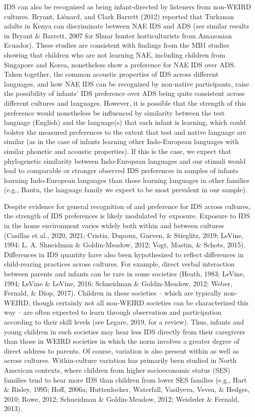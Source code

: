 \documentclass[
  ,man,floatsintext]{apa6}
\begin{document}
IDS can also be recognized as being infant-directed by listeners from non-WEIRD cultures. Bryant, Liénard, and Clark Barrett (2012) reported that Turkanan adults in Kenya can discriminate between NAE IDS and ADS (see similar results in Bryant \& Barrett, 2007 for Shuar hunter horticulturists from Amazonian Ecuador). These studies are consistent with findings from the MB1 studies showing that children who are not learning NAE, including children from Singapore and Korea, nonetheless show a preference for NAE IDS over ADS. Taken together, the common acoustic properties of IDS across different languages, and how NAE IDS can be recognized by non-native participants, raise the possibility of infants' IDS preference over ADS being quite consistent across different cultures and languages. However, it is possible that the strength of this preference would nonetheless be influenced by similarity between the test language (English) and the language(s) that each infant is learning, which could bolster the measured preferences to the extent that test and native language are similar (as in the case of infants learning other Indo-European languages with similar phonetic and acoustic properties). If this is the case, we expect that phylogenetic similarity between Indo-European languages and our stimuli would lead to comparable or stronger observed IDS preferences in samples of infants learning Indo-European languages than those learning languages in other families (e.g., Bantu, the language family we expect to be most prevalent in our sample).

Despite evidence for general recognition of and preference for IDS across cultures, the strength of IDS preferences is likely modulated by exposure. Exposure to IDS in the home environment varies widely both within and between cultures (Casillas et al., 2020, 2021; Cristia, Dupoux, Gurven, \& Stieglitz, 2019; LeVine, 1994; L. A. Shneidman \& Goldin-Meadow, 2012; Vogt, Mastin, \& Schots, 2015). Differences in IDS quantity have also been hypothesized to reflect differences in child-rearing practices across cultures. For example, direct verbal interaction between parents and infants can be rare in some societies (Heath, 1983; LeVine, 1994; LeVine \& LeVine, 2016; Schneidman \& Goldin-Meadow, 2012; Weber, Fernald, \& Diop, 2017). Children in these societies -- which are typically non-WEIRD, though certainly not all non-WEIRD societies can be characterized this way -- are often expected to learn through observation and participation according to their skill levels (see Legare, 2019, for a review). Thus, infants and young children in such societies may hear less IDS directly from their caregivers than those in WEIRD societies in which the norm involves a greater degree of direct address to parents. Of course, variation is also present within as well as across cultures. Within-culture variation has primarily been studied in North American contexts, where children from higher socioeconomic status (SES) families tend to hear more IDS than children from lower SES families (e.g., Hart \& Risley, 1995; Hoff, 2006a; Huttenlocher, Waterfall, Vasilyeva, Vevea, \& Hedges, 2010; Rowe, 2012; Schneidman \& Goldin-Meadow, 2012; Weisleder \& Fernald, 2013).
\end{document}
